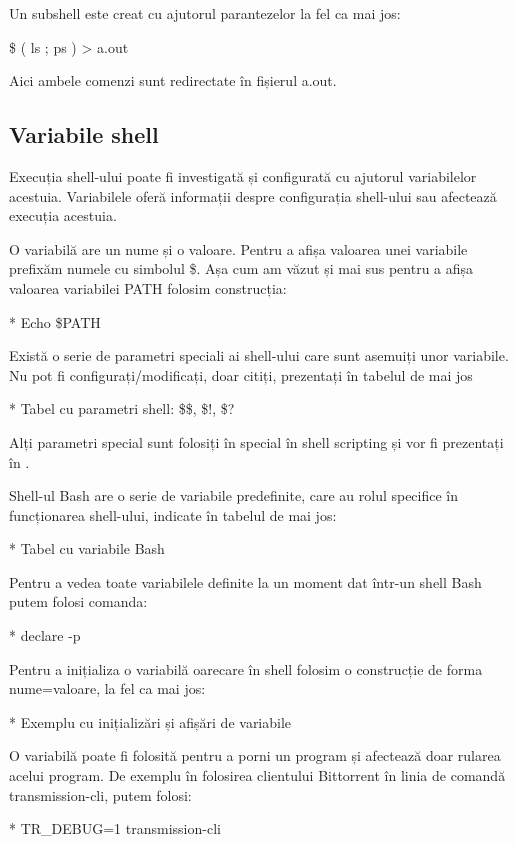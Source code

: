 Un subshell este creat cu ajutorul parantezelor la fel ca mai jos:

\begin{screen}
\$ ( ls ; ps ) > a.out
\end{screen}

Aici ambele comenzi sunt redirectate în fișierul a.out.

\subsection{Variabile shell}
\label{sec:cli-shell-variable}

Execuția shell-ului poate fi investigată și configurată cu ajutorul variabilelor
acestuia. Variabilele oferă informații despre configurația shell-ului sau
afectează execuția acestuia.

O variabilă are un nume și o valoare. Pentru a afișa valoarea unei variabile
prefixăm numele cu simbolul \$. Așa cum am văzut și mai sus pentru a afișa
valoarea variabilei PATH folosim construcția:

* Echo \$PATH

Există o serie de parametri speciali ai shell-ului care sunt asemuiți unor
variabile. Nu pot fi configurați/modificați, doar citiți, prezentați în tabelul
de mai jos

* Tabel cu parametri shell: \$\$, \$!, \$?

Alți parametri special sunt folosiți în special în shell scripting și vor fi
prezentați în .

Shell-ul Bash are o serie de variabile predefinite, care au rolul specifice în
funcționarea shell-ului, indicate în tabelul de mai jos:

* Tabel cu variabile Bash

Pentru a vedea toate variabilele definite la un moment dat într-un shell Bash
putem folosi comanda:

* declare -p

Pentru a inițializa o variabilă oarecare în shell folosim o construcție de forma
nume=valoare, la fel ca mai jos:

* Exemplu cu inițializări și afișări de variabile

O variabilă poate fi folosită pentru a porni un program și afectează doar
rularea acelui program. De exemplu în folosirea clientului Bittorrent în linia
de comandă transmission-cli, putem folosi:

* TR_DEBUG=1 transmission-cli

